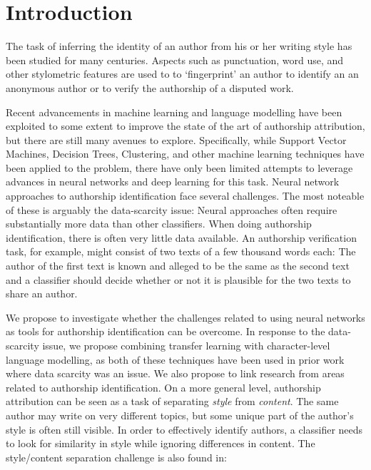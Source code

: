 \section*{Introduction}
The task of inferring the identity of an author from his or her writing style has been studied for many centuries. Aspects such as punctuation, word use, and other stylometric features are used to
to `fingerprint' an author to identify an an anonymous author or to verify the authorship of a disputed work.

Recent advancements in machine learning and language modelling have been exploited to some extent to improve the state of the art of authorship attribution, but there are still many avenues to explore. 
Specifically, while Support Vector Machines, Decision Trees, Clustering, and other machine learning techniques have been applied to the problem, there have only been limited attempts to leverage advances in 
neural networks and deep learning for this task.
Neural network approaches to authorship identification face several challenges. The most noteable of these is arguably the data-scarcity issue: Neural approaches often require substantially more data than other classifiers. When doing authorship identification, there is often very little data available. An authorship verification task, for example, might consist of two texts of a few thousand words each: The author of the first text is known and alleged to be the same as the second text and a classifier should decide whether or not it is plausible for the two texts to share an author.

We propose to investigate whether the challenges related to using neural networks as tools for authorship identification can be overcome.
In response to the data-scarcity issue, we propose combining transfer learning with character-level language modelling, 
as both of these techniques have been used in prior work where data scarcity was an issue. 
We also propose to link research from areas related to authorship identification. 
On a more general level, authorship attribution can be seen as a task of separating \textit{style} from \textit{content}. 
The same author may write on very different topics, but some unique part of the author's style is often still visible. 
In order to effectively identify authors, a classifier needs to look for similarity in style while ignoring differences in content. 
The style/content separation challenge is also found in:

